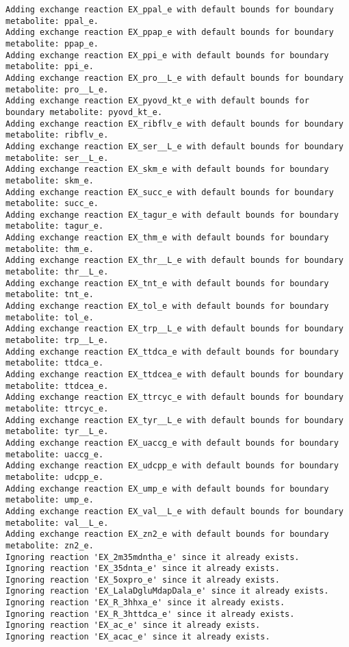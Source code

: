 \documentclass[
  letterpaper,
  DIV=11,
  numbers=noendperiod]{scrartcl}
\begin{document}
\begin{verbatim}
Adding exchange reaction EX_ppal_e with default bounds for boundary metabolite: ppal_e.
Adding exchange reaction EX_ppap_e with default bounds for boundary metabolite: ppap_e.
Adding exchange reaction EX_ppi_e with default bounds for boundary metabolite: ppi_e.
Adding exchange reaction EX_pro__L_e with default bounds for boundary metabolite: pro__L_e.
Adding exchange reaction EX_pyovd_kt_e with default bounds for boundary metabolite: pyovd_kt_e.
Adding exchange reaction EX_ribflv_e with default bounds for boundary metabolite: ribflv_e.
Adding exchange reaction EX_ser__L_e with default bounds for boundary metabolite: ser__L_e.
Adding exchange reaction EX_skm_e with default bounds for boundary metabolite: skm_e.
Adding exchange reaction EX_succ_e with default bounds for boundary metabolite: succ_e.
Adding exchange reaction EX_tagur_e with default bounds for boundary metabolite: tagur_e.
Adding exchange reaction EX_thm_e with default bounds for boundary metabolite: thm_e.
Adding exchange reaction EX_thr__L_e with default bounds for boundary metabolite: thr__L_e.
Adding exchange reaction EX_tnt_e with default bounds for boundary metabolite: tnt_e.
Adding exchange reaction EX_tol_e with default bounds for boundary metabolite: tol_e.
Adding exchange reaction EX_trp__L_e with default bounds for boundary metabolite: trp__L_e.
Adding exchange reaction EX_ttdca_e with default bounds for boundary metabolite: ttdca_e.
Adding exchange reaction EX_ttdcea_e with default bounds for boundary metabolite: ttdcea_e.
Adding exchange reaction EX_ttrcyc_e with default bounds for boundary metabolite: ttrcyc_e.
Adding exchange reaction EX_tyr__L_e with default bounds for boundary metabolite: tyr__L_e.
Adding exchange reaction EX_uaccg_e with default bounds for boundary metabolite: uaccg_e.
Adding exchange reaction EX_udcpp_e with default bounds for boundary metabolite: udcpp_e.
Adding exchange reaction EX_ump_e with default bounds for boundary metabolite: ump_e.
Adding exchange reaction EX_val__L_e with default bounds for boundary metabolite: val__L_e.
Adding exchange reaction EX_zn2_e with default bounds for boundary metabolite: zn2_e.
Ignoring reaction 'EX_2m35mdntha_e' since it already exists.
Ignoring reaction 'EX_35dnta_e' since it already exists.
Ignoring reaction 'EX_5oxpro_e' since it already exists.
Ignoring reaction 'EX_LalaDgluMdapDala_e' since it already exists.
Ignoring reaction 'EX_R_3hhxa_e' since it already exists.
Ignoring reaction 'EX_R_3httdca_e' since it already exists.
Ignoring reaction 'EX_ac_e' since it already exists.
Ignoring reaction 'EX_acac_e' since it already exists.

\end{verbatim}
\end{document}

